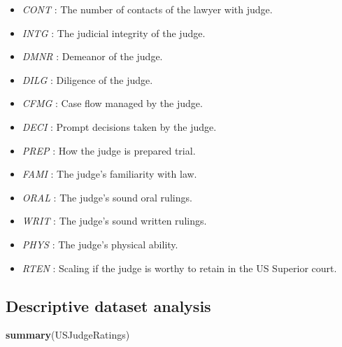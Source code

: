 \documentclass[]{article}
\newenvironment{Shaded}{\begin{snugshade}}{\end{snugshade}}
\newcommand{\KeywordTok}[1]{\textcolor[rgb]{0.13,0.29,0.53}{\textbf{#1}}}
\newcommand{\NormalTok}[1]{#1}
\providecommand{\tightlist}{%
  \setlength{\itemsep}{0pt}\setlength{\parskip}{0pt}}
\begin{document}
\begin{itemize}
\tightlist
\item
  \emph{CONT} : The number of contacts of the lawyer with judge.
\item
  \emph{INTG} : The judicial integrity of the judge.
\item
  \emph{DMNR} : Demeanor of the judge.
\item
  \emph{DILG} : Diligence of the judge.
\item
  \emph{CFMG} : Case flow managed by the judge.
\item
  \emph{DECI} : Prompt decisions taken by the judge.
\item
  \emph{PREP} : How the judge is prepared trial.
\item
  \emph{FAMI} : The judge's familiarity with law.
\item
  \emph{ORAL} : The judge's sound oral rulings.
\item
  \emph{WRIT} : The judge's sound written rulings.
\item
  \emph{PHYS} : The judge's physical ability.
\item
  \emph{RTEN} : Scaling if the judge is worthy to retain in the US
  Superior court.
\end{itemize}

\hypertarget{descriptive-dataset-analysis}{%
\subsection{Descriptive dataset
analysis}\label{descriptive-dataset-analysis}}

\begin{Shaded}
\begin{Highlighting}[]
\KeywordTok{summary}\NormalTok{(USJudgeRatings)}
\end{Highlighting}
\end{Shaded}
\end{document}
